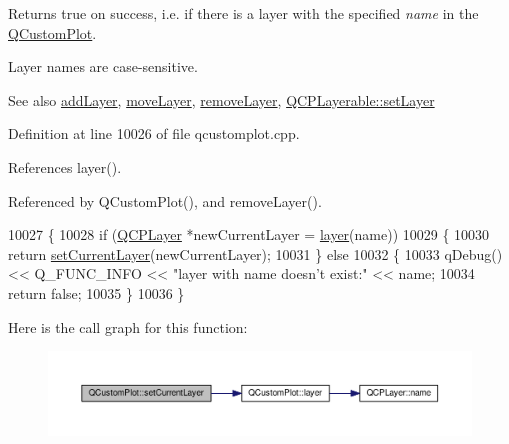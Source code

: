 Returns true on success, i.\+e. if there is a layer with the specified {\itshape name} in the \hyperlink{class_q_custom_plot}{Q\+Custom\+Plot}.

Layer names are case-\/sensitive.

\begin{DoxySeeAlso}{See also}
\hyperlink{class_q_custom_plot_ad5255393df078448bb6ac83fa5db5f52}{add\+Layer}, \hyperlink{class_q_custom_plot_ae896140beff19424e9e9e02d6e331104}{move\+Layer}, \hyperlink{class_q_custom_plot_a40f75e342c5eaab6a86066a42a0e2a94}{remove\+Layer}, \hyperlink{class_q_c_p_layerable_ab0d0da6d2de45a118886d2c8e16d5a54}{Q\+C\+P\+Layerable\+::set\+Layer} 
\end{DoxySeeAlso}


Definition at line 10026 of file qcustomplot.\+cpp.



References layer().



Referenced by Q\+Custom\+Plot(), and remove\+Layer().


\begin{DoxyCode}
10027 \{
10028   \textcolor{keywordflow}{if} (\hyperlink{class_q_c_p_layer}{QCPLayer} *newCurrentLayer = \hyperlink{class_q_custom_plot_aac492da01782820454e9136a8db28182}{layer}(name))
10029   \{
10030     \textcolor{keywordflow}{return} \hyperlink{class_q_custom_plot_a73a6dc47c653bb6f8f030abca5a11852}{setCurrentLayer}(newCurrentLayer);
10031   \} \textcolor{keywordflow}{else}
10032   \{
10033     qDebug() << Q\_FUNC\_INFO << \textcolor{stringliteral}{"layer with name doesn't exist:"} << name;
10034     \textcolor{keywordflow}{return} \textcolor{keyword}{false};
10035   \}
10036 \}
\end{DoxyCode}


Here is the call graph for this function\+:\nopagebreak
\begin{figure}[H]
\begin{center}
\leavevmode
\includegraphics[width=350pt]{class_q_custom_plot_a73a6dc47c653bb6f8f030abca5a11852_cgraph}
\end{center}
\end{figure}




